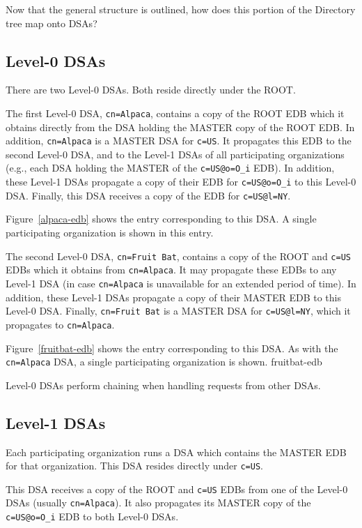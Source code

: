 Now that the general structure is outlined,
how does this portion of the Directory tree map onto DSAs?

\subsection	{Level-0 DSAs}
There are two Level-0 DSAs.
Both reside directly under the ROOT.

The first Level-0 DSA, \verb"cn=Alpaca",
contains a copy of the ROOT EDB which it obtains directly from the
DSA holding the MASTER copy of the ROOT EDB.
In addition,
\verb"cn=Alpaca" is a MASTER DSA for \verb"c=US".
It propagates this EDB to the second Level-0 DSA,
and to the Level-1 DSAs of all participating organizations
(e.g., each DSA holding the MASTER of the \verb"c=US@o=O_i" EDB).
In addition,
these Level-1 DSAs propagate a copy of their EDB for \verb"c=US@o=O_i"
to this Level-0 DSA.
Finally,
this DSA receives a copy of the EDB for \verb"c=US@l=NY".

Figure~\ref{alpaca-edb} shows the entry corresponding to this DSA.
A single participating organization is shown in this entry.

The second Level-0 DSA, \verb"cn=Fruit Bat",
contains a copy of the ROOT and \verb"c=US" EDBs which it obtains from
\verb"cn=Alpaca".
It may propagate these EDBs to any Level-1 DSA
(in case \verb"cn=Alpaca" is unavailable for an extended period of time).
In addition,
these Level-1 DSAs
propagate a copy of their MASTER EDB to this Level-0 DSA.
Finally,
\verb"cn=Fruit Bat" is a MASTER DSA for \verb"c=US@l=NY",
which it propagates to \verb"cn=Alpaca".

Figure~\ref{fruitbat-edb} shows the entry corresponding to this DSA.
As with the \verb"cn=Alpaca" DSA,
a single participating organization is shown.
%
	{fruitbat-edb}

Level-0 DSAs perform chaining when handling requests from other DSAs.

\subsection	{Level-1 DSAs}
Each participating organization runs a DSA which contains the MASTER EDB
for that organization.
This DSA resides directly under \verb"c=US".

This DSA receives a copy of the ROOT and \verb"c=US" EDBs from
one of the Level-0 DSAs (usually \verb"cn=Alpaca").
It also propagates its MASTER copy of the \verb"c=US@o=O_i" EDB to
both Level-0 DSAs.

